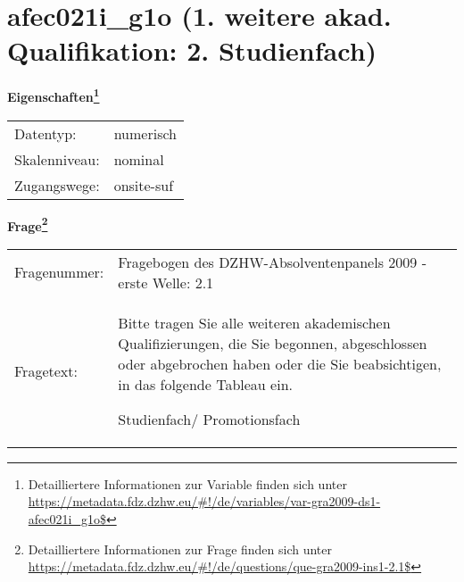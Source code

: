 
    \setcounter{footnote}{0}

    \vspace*{-1.8cm}
	\section{afec021i\_g1o (1. weitere akad. Qualifikation: 2. Studienfach)}
	\label{section:afec021i_g1o}



    \vspace*{0.5cm}
    \noindent\textbf{Eigenschaften\footnote{Detailliertere Informationen zur Variable finden sich unter
		\url{https://metadata.fdz.dzhw.eu/\#!/de/variables/var-gra2009-ds1-afec021i_g1o$}}}\\
	\begin{tabularx}{\hsize}{@{}lX}
	Datentyp: & numerisch \\
	Skalenniveau: & nominal \\
	Zugangswege: &
	  onsite-suf
 \\
    \end{tabularx}



				\vspace*{0.5cm}
                \noindent\textbf{Frage\footnote{Detailliertere Informationen zur Frage finden sich unter
		              \url{https://metadata.fdz.dzhw.eu/\#!/de/questions/que-gra2009-ins1-2.1$}}}\\
				\begin{tabularx}{\hsize}{@{}lX}
					Fragenummer: &
					  Fragebogen des DZHW-Absolventenpanels 2009 - erste Welle:
					  2.1
 \\
					Fragetext: & Bitte tragen Sie alle weiteren akademischen Qualifizierungen, die Sie begonnen, abgeschlossen oder abgebrochen haben oder die Sie beabsichtigen, in das folgende Tableau ein.\par  Studienfach/ Promotionsfach \\
				\end{tabularx}





